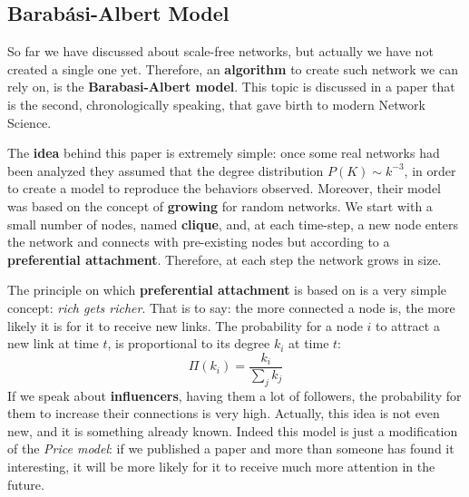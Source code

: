 \documentclass[../main/main.tex]{subfiles}
\begin{document}
\subsection{Barabási-Albert Model}
So far we have discussed about scale-free networks, but actually we have not created a single one yet. Therefore, an \textbf{algorithm} to create such network we can rely on, is the \textbf{Barabasi-Albert model}. This topic is discussed in a paper that is the second, chronologically speaking, that gave birth to modern Network Science. 

The \textbf{idea} behind this paper is extremely simple: once some real networks had been analyzed they assumed that the degree distribution \( P(K) \sim k^{-3} \), in order to create a model to reproduce the behaviors observed.
Moreover, their model was based on the concept of \textbf{growing} for random networks. We start with a small number of nodes, named \textbf{clique}, and, at each time-step, a new node enters the network and connects with pre-existing nodes but according to a \textbf{preferential attachment}. Therefore, at each step the network grows in size.

The principle on which \textbf{preferential attachment} is based on is a very simple concept: \textit{rich gets richer}. That is to say: the more connected a node is, the more likely it is for it to receive new links. The probability for a node $i$ to attract a new link at time $t$, is proportional to its degree $k_i$ at time $t$:
\begin{equation}
  \Pi (k_i) = \frac{k_i}{\sum_{j}^{} k_j }
\end{equation}
If we speak about \textbf{influencers}, having them a lot of followers, the probability for them to increase their connections is very high. Actually, this idea is not even new, and it is something already known. Indeed this model is just a modification of the \textit{Price model}: if we published a paper and more than someone has found it interesting, it will be more likely for it to receive much more attention in the future.
\end{document}
